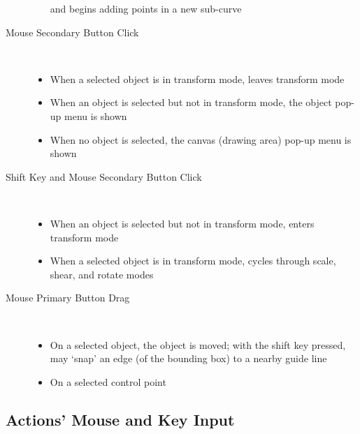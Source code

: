 \begin{description}
\begin{itemize}
		        and begins adding points in a new sub-curve
		    \end{itemize}
		  \item[Mouse Secondary Button Click] \hfill \\
		    \begin{itemize}
		      \item When a selected object is in transform mode,
		        leaves transform mode
		      \item When an object is selected but not in
		        transform mode, the object pop-up menu is shown
		      \item When no object is selected,
		        the canvas (drawing area) pop-up menu is shown
		    \end{itemize}
		  \item[Shift Key and Mouse Secondary Button Click] \hfill \\
		    \begin{itemize}
		      \item When an object is selected but not in
		        transform mode, enters transform mode
		      \item When a selected object is in transform mode,
		        cycles through scale, shear, and rotate modes
		    \end{itemize}
		  \item[Mouse Primary Button Drag] \hfill \\
		    \begin{itemize}
		      \item On a selected object, the
		        object is moved; with the shift key
		        pressed, may `snap' an edge (of the bounding
		        box) to a nearby guide line
		      \item On a selected control point
		    \end{itemize}
		\end{description}

		\subsection{Actions' Mouse and Key Input}%
		\label{ssec:action_to_input}
















